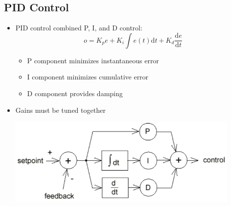 \documentclass[10pt]{article}
\newcommand{\dd}{\text{d}}
\begin{document}
\subsection*{PID Control}
\begin{itemize}
	\item PID control combined P, I, and D control:
	\[o = K_p e + K_i \int e(t) \dd t + K_d \frac{\dd e}{\dd t}\]
    \begin{itemize}
        \item P component minimizes instantaneous error
        \item I component minimizes cumulative error
        \item D component provides damping
    \end{itemize}
    \item Gains must be tuned together
    \begin{center} 
        \includegraphics*[width=0.9\textwidth]{L2_17.png} 
    \end{center}
\end{itemize}
\end{document}
